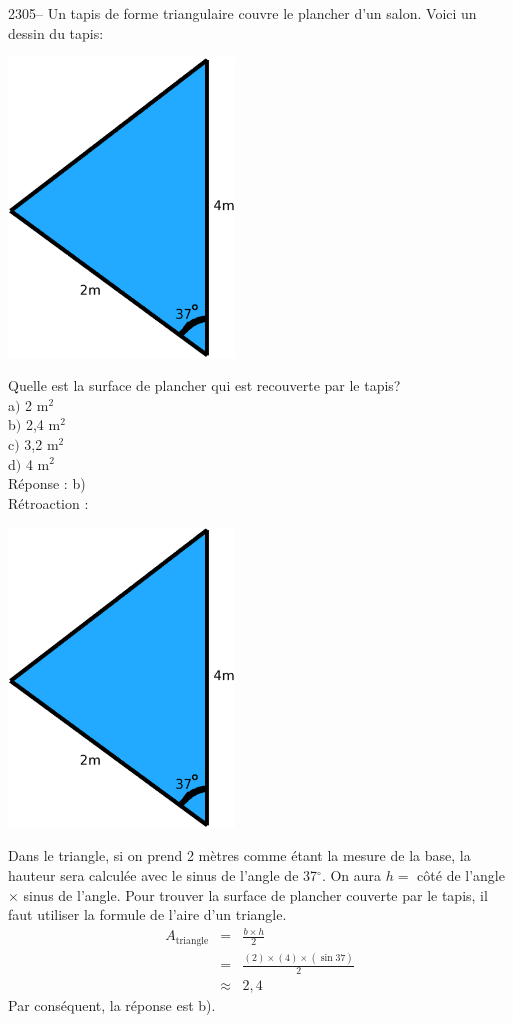\documentclass[letterpaper, 12pt]{article}
\begin{document}
2305-- Un tapis de forme triangulaire couvre le plancher d'un salon. Voici un dessin du tapis:
\begin{center}
 \includegraphics[width=6cm,bb=14 14 627 807]{Q2305.eps}
\end{center}
Quelle est la surface de plancher qui est recouverte par le tapis?\\

a$)$ 2 m$^{2}$\\
b$)$ 2,4 m$^{2}$\\
c$)$ 3,2 m$^{2}$\\
d$)$ 4 m$^{2}$\\

R\'eponse : b)\\

R\'etroaction :
\begin{center}
 \includegraphics[width=6cm,bb=14 14 627 807]{Q2305.eps}
\end{center}
Dans le triangle, si on prend 2 m\`etres comme \'etant la mesure de la base, la hauteur sera calcul\'ee avec le sinus de l'angle de 37$^{\circ}$. On aura $h=$ c\^ot\'e de l'angle $\times$ sinus de l'angle.
Pour trouver la surface de plancher couverte par le tapis, il faut utiliser la formule de l'aire d'un triangle.
\begin{eqnarray*}
A_{\textrm{triangle}}&=&\frac{b\times h}{2}\\[2mm]
&=&\frac{(2)\times(4)\times(\sin{37})}{2}\\[2mm]
&\approx&2,4
\end{eqnarray*}
Par cons\'equent, la r\'eponse est b).\\
\end{document}
